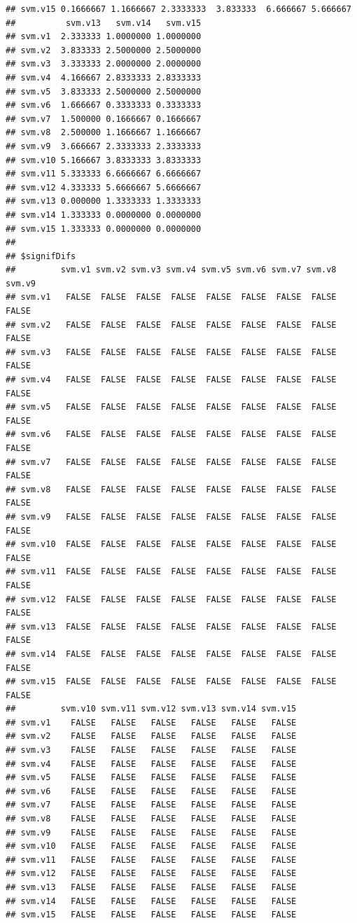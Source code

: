\documentclass[10pt,a4paper]{article}\usepackage[]{graphicx}\usepackage[]{color}
\makeatletter
\newenvironment{kframe}{%
 \def\at@end@of@kframe{}%
 \ifinner\ifhmode%
  \def\at@end@of@kframe{\end{minipage}}%
  \begin{minipage}{\columnwidth}%
 \fi\fi%
 \def\FrameCommand##1{\hskip\@totalleftmargin \hskip-\fboxsep
 \colorbox{shadecolor}{##1}\hskip-\fboxsep
     \hskip-\linewidth \hskip-\@totalleftmargin \hskip\columnwidth}%
 \MakeFramed {\advance\hsize-\width
   \@totalleftmargin\z@ \linewidth\hsize
   \@setminipage}}%
 {\par\unskip\endMakeFramed%
 \at@end@of@kframe}
\newenvironment{knitrout}{}{} %
\makeatother
\begin{document}
\begin{knitrout}
\begin{kframe}
\begin{verbatim}
## svm.v15 0.1666667 1.1666667 2.3333333  3.833333  6.666667 5.666667
##          svm.v13   svm.v14   svm.v15
## svm.v1  2.333333 1.0000000 1.0000000
## svm.v2  3.833333 2.5000000 2.5000000
## svm.v3  3.333333 2.0000000 2.0000000
## svm.v4  4.166667 2.8333333 2.8333333
## svm.v5  3.833333 2.5000000 2.5000000
## svm.v6  1.666667 0.3333333 0.3333333
## svm.v7  1.500000 0.1666667 0.1666667
## svm.v8  2.500000 1.1666667 1.1666667
## svm.v9  3.666667 2.3333333 2.3333333
## svm.v10 5.166667 3.8333333 3.8333333
## svm.v11 5.333333 6.6666667 6.6666667
## svm.v12 4.333333 5.6666667 5.6666667
## svm.v13 0.000000 1.3333333 1.3333333
## svm.v14 1.333333 0.0000000 0.0000000
## svm.v15 1.333333 0.0000000 0.0000000
## 
## $signifDifs
##         svm.v1 svm.v2 svm.v3 svm.v4 svm.v5 svm.v6 svm.v7 svm.v8 svm.v9
## svm.v1   FALSE  FALSE  FALSE  FALSE  FALSE  FALSE  FALSE  FALSE  FALSE
## svm.v2   FALSE  FALSE  FALSE  FALSE  FALSE  FALSE  FALSE  FALSE  FALSE
## svm.v3   FALSE  FALSE  FALSE  FALSE  FALSE  FALSE  FALSE  FALSE  FALSE
## svm.v4   FALSE  FALSE  FALSE  FALSE  FALSE  FALSE  FALSE  FALSE  FALSE
## svm.v5   FALSE  FALSE  FALSE  FALSE  FALSE  FALSE  FALSE  FALSE  FALSE
## svm.v6   FALSE  FALSE  FALSE  FALSE  FALSE  FALSE  FALSE  FALSE  FALSE
## svm.v7   FALSE  FALSE  FALSE  FALSE  FALSE  FALSE  FALSE  FALSE  FALSE
## svm.v8   FALSE  FALSE  FALSE  FALSE  FALSE  FALSE  FALSE  FALSE  FALSE
## svm.v9   FALSE  FALSE  FALSE  FALSE  FALSE  FALSE  FALSE  FALSE  FALSE
## svm.v10  FALSE  FALSE  FALSE  FALSE  FALSE  FALSE  FALSE  FALSE  FALSE
## svm.v11  FALSE  FALSE  FALSE  FALSE  FALSE  FALSE  FALSE  FALSE  FALSE
## svm.v12  FALSE  FALSE  FALSE  FALSE  FALSE  FALSE  FALSE  FALSE  FALSE
## svm.v13  FALSE  FALSE  FALSE  FALSE  FALSE  FALSE  FALSE  FALSE  FALSE
## svm.v14  FALSE  FALSE  FALSE  FALSE  FALSE  FALSE  FALSE  FALSE  FALSE
## svm.v15  FALSE  FALSE  FALSE  FALSE  FALSE  FALSE  FALSE  FALSE  FALSE
##         svm.v10 svm.v11 svm.v12 svm.v13 svm.v14 svm.v15
## svm.v1    FALSE   FALSE   FALSE   FALSE   FALSE   FALSE
## svm.v2    FALSE   FALSE   FALSE   FALSE   FALSE   FALSE
## svm.v3    FALSE   FALSE   FALSE   FALSE   FALSE   FALSE
## svm.v4    FALSE   FALSE   FALSE   FALSE   FALSE   FALSE
## svm.v5    FALSE   FALSE   FALSE   FALSE   FALSE   FALSE
## svm.v6    FALSE   FALSE   FALSE   FALSE   FALSE   FALSE
## svm.v7    FALSE   FALSE   FALSE   FALSE   FALSE   FALSE
## svm.v8    FALSE   FALSE   FALSE   FALSE   FALSE   FALSE
## svm.v9    FALSE   FALSE   FALSE   FALSE   FALSE   FALSE
## svm.v10   FALSE   FALSE   FALSE   FALSE   FALSE   FALSE
## svm.v11   FALSE   FALSE   FALSE   FALSE   FALSE   FALSE
## svm.v12   FALSE   FALSE   FALSE   FALSE   FALSE   FALSE
## svm.v13   FALSE   FALSE   FALSE   FALSE   FALSE   FALSE
## svm.v14   FALSE   FALSE   FALSE   FALSE   FALSE   FALSE
## svm.v15   FALSE   FALSE   FALSE   FALSE   FALSE   FALSE
\end{verbatim}
\end{kframe}
\end{knitrout}
\end{document}
